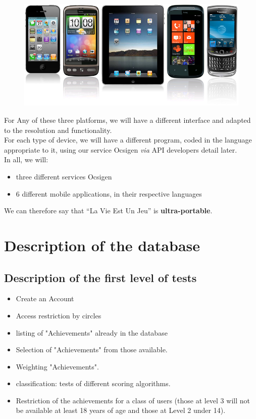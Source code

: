\documentclass {life-en}
\begin{document}
\begin{figure} [H]
  \begin{center}
    \includegraphics [width = 13cm]{img/mobiles.jpg}
  \end{center}
\end{figure}

For Any of these three platforms, we will have a different interface
and adapted to the resolution and functionality.\\
For each type of device, we will have a different program,
coded in the language appropriate to it, using our service Ocsigen
\textit{via} API developers detail later.\\
In all, we will:
\begin{itemize}
  \item three different services Ocsigen
  \item 6 different mobile applications, in their respective languages
\end{itemize}

We can therefore say that ``La Vie Est Un Jeu'' is \textbf{ultra-portable}.


\chapter{Description of the database}

\section{Description of the first level of tests}

\begin{itemize}
  \item Create an Account
  \item Access restriction by circles
  \item listing of "Achievements" already in the database
  \item Selection of "Achievements" from those available.
  \item Weighting "Achievements".
  \item classification: tests of different scoring algorithms.
  \item Restriction of the achievements for a class of users (those at level 3 will not be available at least 18 years of age and those at Level 2 under 14).
\end{itemize}
\end{document}
